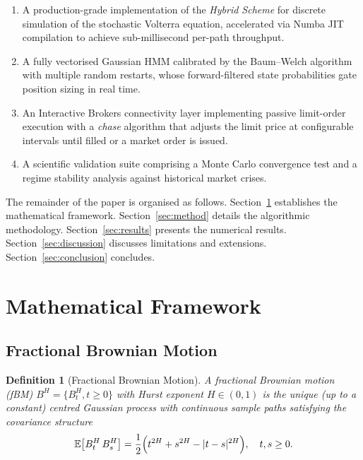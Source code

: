 \documentclass[conference]{IEEEtran}
\newtheorem{definition}{Definition}
\newcommand{\E}{\mathbb{E}}
\newcommand{\abs}[1]{\lvert #1 \rvert}
\begin{document}
\begin{enumerate}[leftmargin=*, label=\textbf{C\arabic*.}]
  \item A production-grade implementation of the \emph{Hybrid Scheme}
        \cite{bennedsen2017hybrid} for discrete simulation of the
        stochastic Volterra equation, accelerated via Numba JIT
        compilation to achieve sub-millisecond per-path throughput.

  \item A fully vectorised Gaussian HMM calibrated by the
        Baum--Welch algorithm with multiple random restarts, whose
        forward-filtered state probabilities gate position sizing in
        real time.

  \item An Interactive Brokers connectivity layer implementing
        passive limit-order execution with a \emph{chase} algorithm
        that adjusts the limit price at configurable intervals until
        filled or a market order is issued.

  \item A scientific validation suite comprising a Monte Carlo
        convergence test and a regime stability analysis against
        historical market crises.
\end{enumerate}

The remainder of the paper is organised as follows.
Section~\ref{sec:math} establishes the mathematical framework.
Section~\ref{sec:method} details the algorithmic methodology.
Section~\ref{sec:results} presents the numerical results.
Section~\ref{sec:discussion} discusses limitations and extensions.
Section~\ref{sec:conclusion} concludes.

\section{Mathematical Framework}\label{sec:math}

\subsection{Fractional Brownian Motion}

\begin{definition}[Fractional Brownian Motion]
A fractional Brownian motion (fBM) $B^H = \{B^H_t, t \geq 0\}$ with
Hurst exponent $H \in (0,1)$ is the unique (up to a constant) centred
Gaussian process with continuous sample paths satisfying the covariance
structure
\begin{equation}\label{eq:fbm_cov}
  \E\bigl[B^H_t\, B^H_s\bigr]
  = \frac{1}{2}\Bigl(t^{2H} + s^{2H} - \abs{t-s}^{2H}\Bigr),
  \quad t,s \geq 0.
\end{equation}
\end{definition}
\end{document}
